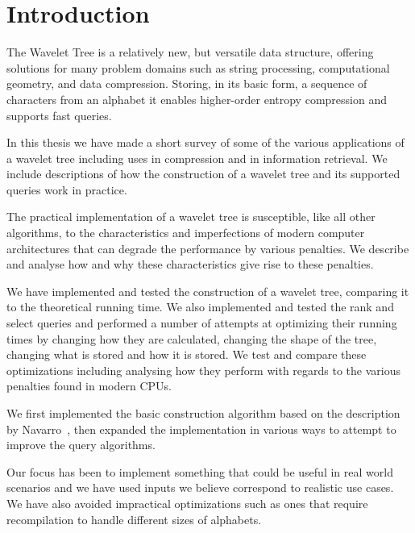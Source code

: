 \section{Introduction}
The Wavelet Tree is a relatively new, but versatile data structure, offering solutions for many problem domains such as string processing, computational geometry, and data compression.
Storing, in its basic form, a sequence of characters from an alphabet it enables higher-order entropy compression and supports fast queries.

In this thesis we have made a short survey of some of the various applications of a wavelet tree including uses in compression and in information retrieval.
We include descriptions of how the construction of a wavelet tree and its supported queries work in practice.

The practical implementation of a wavelet tree is susceptible, like all other algorithms, to the characteristics and imperfections of modern computer architectures that can degrade the performance by various penalties.
We describe and analyse how and why these characteristics give rise to these penalties.

We have implemented and tested the construction of a wavelet tree, comparing it to the theoretical running time.
We also implemented and tested the rank and select queries and performed a number of attempts at optimizing their running times by changing how they are calculated, changing the shape of the tree, changing what is stored and how it is stored.
We test and compare these optimizations including analysing how they perform with regards to the various penalties found in modern CPUs.

We first implemented the basic construction algorithm based on the description by Navarro~, then expanded the implementation in various ways to attempt to improve the query algorithms.

Our focus has been to implement something that could be useful in real world scenarios and we have used inputs we believe correspond to realistic use cases.
We have also avoided impractical optimizations such as ones that require recompilation to handle different sizes of alphabets.